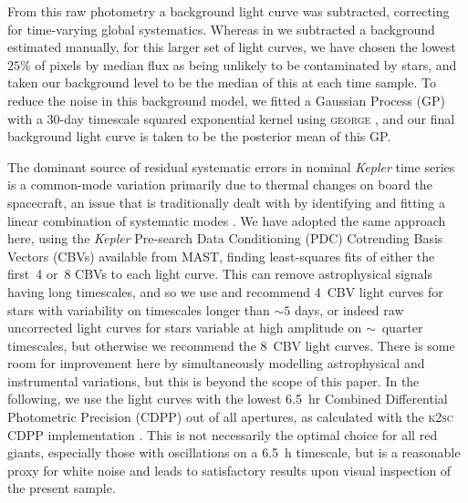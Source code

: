 \documentclass[modern]{aastex62}
\newcommand{\kepler}{\textit{Kepler}\xspace}
\newcommand{\gaia}{\textit{Gaia}\xspace}
\begin{document}
From this raw photometry a background light curve was subtracted, correcting for time-varying global systematics. Whereas in \citet{smear} we subtracted a background estimated manually, for this larger set of light curves, we have chosen the lowest $25\%$ of pixels by median flux as being unlikely to be contaminated by stars, and taken our background level to be the median of this at each time sample. To reduce the noise in this background model, we fitted a Gaussian Process (GP) with a 30-day timescale squared exponential kernel using \textsc{george} \citep{hodlr}, and our final background light curve is taken to be the posterior mean of this GP. 

The dominant source of residual systematic errors in nominal \kepler time series is a common-mode variation primarily due to thermal changes on board the spacecraft, an issue that is traditionally dealt with by identifying and fitting a linear combination of systematic modes \citep{pdc0,pdc1,pdc2,petigura}. We have adopted the same approach here, using the \kepler Pre-search Data Conditioning (PDC) Cotrending Basis Vectors (CBVs) available from MAST, finding least-squares fits of either the first~4 or~8 CBVs to each light curve. This can remove astrophysical signals having long timescales, and so we use and recommend 4~CBV light curves for stars with variability on timescales longer than $\sim 5$ days, or indeed raw uncorrected light curves for stars variable at high amplitude on $\sim$~quarter timescales, but otherwise we recommend the 8~CBV light curves. There is some room for improvement here by simultaneously modelling astrophysical and instrumental variations, but this is beyond the scope of this paper. In the following, we use the light curves with the lowest 6.5~hr Combined Differential Photometric Precision (CDPP) \citep{cdpp} out of all apertures, as calculated with the \textsc{k2sc} CDPP implementation \citep{k2sc}. This is not necessarily the optimal choice for all red giants, especially those with oscillations on a 6.5~h timescale, but is a reasonable proxy for white noise and leads to satisfactory results upon visual inspection of the present sample.


\begin{figure*}

\caption{\label{hrdiagram}
\gaia colour-magnitude diagram of the Smear Campaign stars (orange and teal) overlaid on the sample of \kepler stars with \gaia parallax $\text{SNR} > 25$ (black), using the Bedell \href{https://gaia-kepler.fun}{\nolinkurl{gaia-kepler.fun}} crossmatch and \gaia~DR2 calibrated distances from \citet{gaiadists}. The smear sample includes giants and hot main-sequence stars. Those giants for which TRES spectroscopy have been obtained are highlighted in teal. Three stars discussed in the text are marked with $\star$ symbols. An interactive version of this diagram is available as supplementary material from the journal or at  \href{https://benjaminpope.github.io/data/cmd_smear.html}{\nolinkurl{benjaminpope.github.io/data/cmd_smear.html}}.}
\end{figure*}
\end{document}

